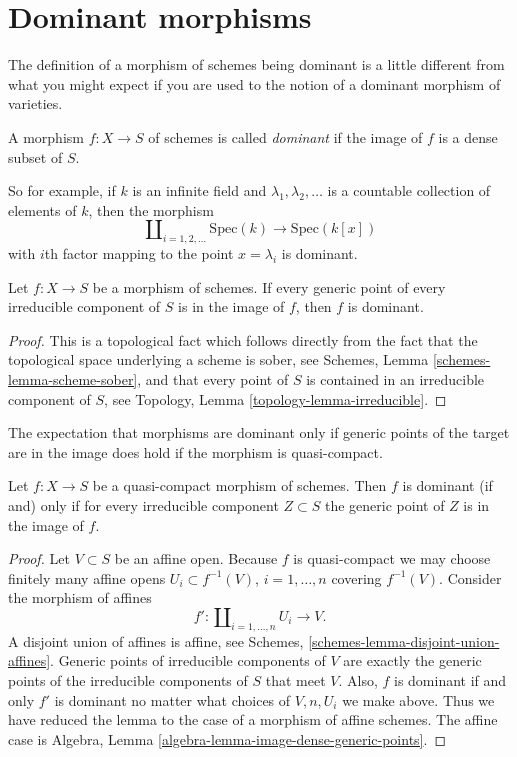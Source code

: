 \section{Dominant morphisms}
\label{section-dominant}

\noindent
The definition of a morphism of schemes being dominant is a little
different from what you might expect if you are used to the notion
of a dominant morphism of varieties.

\begin{definition}
\label{definition-dominant}
A morphism $f : X \to S$ of schemes is called {\it dominant} if the
image of $f$ is a dense subset of $S$.
\end{definition}

\noindent
So for example, if $k$ is an infinite field and $\lambda_1, \lambda_2, \ldots$
is a countable collection of elements of $k$, then the morphism
$$
\coprod\nolimits_{i = 1, 2, \ldots } \text{Spec}(k)
\longrightarrow
\text{Spec}(k[x])
$$
with $i$th factor mapping to the point $x = \lambda_i$ is dominant.

\begin{lemma}
\label{lemma-generic-points-in-image-dominant}
Let $f : X \to S$ be a morphism of schemes.
If every generic point of every irreducible component of $S$
is in the image of $f$, then $f$ is dominant.
\end{lemma}

\begin{proof}
This is a topological fact which follows directly from the fact that
the topological space underlying a scheme is sober, see
Schemes, Lemma \ref{schemes-lemma-scheme-sober}, and that
every point of $S$ is contained in an irreducible component of
$S$, see Topology, Lemma \ref{topology-lemma-irreducible}.
\end{proof}

\noindent
The expectation that morphisms are dominant only if generic points of the
target are in the image does hold if the morphism is quasi-compact.

\begin{lemma}
\label{lemma-quasi-compact-dominant}
Let $f : X \to S$ be a quasi-compact morphism of schemes.
Then $f$ is dominant (if and) only if for every irreducible
component $Z \subset S$ the generic point of $Z$ is in the
image of $f$.
\end{lemma}

\begin{proof}
Let $V \subset S$ be an affine open.
Because $f$ is quasi-compact we may choose finitely many affine
opens $U_i \subset f^{-1}(V)$, $i = 1, \ldots, n$ covering
$f^{-1}(V)$. Consider the morphism of affines
$$
f' :
\coprod\nolimits_{i = 1, \ldots, n} U_i
\longrightarrow
V.
$$
A disjoint union of affines is affine, see
Schemes, \ref{schemes-lemma-disjoint-union-affines}.
Generic points of irreducible components of $V$
are exactly the generic points of the irreducible components of
$S$ that meet $V$. Also, $f$ is dominant if and only $f'$ is dominant
no matter what choices of $V, n, U_i$ we make above. Thus we
have reduced the lemma to the case of a morphism of affine schemes.
The affine case is
Algebra, Lemma \ref{algebra-lemma-image-dense-generic-points}.
\end{proof}

